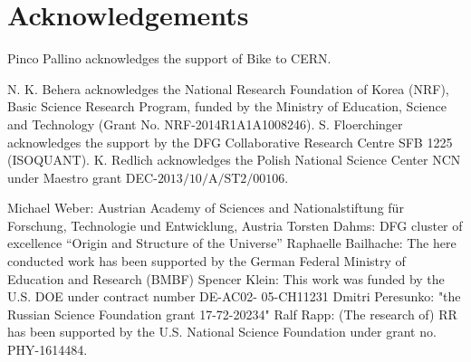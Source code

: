 \section*{Acknowledgements}


Pinco Pallino acknowledges the support of Bike to CERN.

N. K. Behera acknowledges the National Research Foundation of Korea (NRF), Basic Science Research Program, funded by the Ministry of Education, Science and Technology (Grant No. NRF-2014R1A1A1008246).
S. Floerchinger acknowledges the support by the DFG Collaborative Research Centre SFB 1225 (ISOQUANT). 
K. Redlich acknowledges the Polish National Science Center NCN under Maestro grant DEC-$\mathrm{2013/10/A/ST2/00106}$. 

Michael Weber: Austrian Academy of Sciences and Nationalstiftung f\"ur Forschung, Technologie und Entwicklung, Austria
Torsten Dahms: DFG cluster of excellence ``Origin and Structure of the Universe'' 
Raphaelle Bailhache: The here conducted work has been supported by the German Federal Ministry of Education and Research (BMBF)
Spencer Klein: This work was funded by the U.S. DOE under contract number DE-AC02- 05-CH11231
Dmitri Peresunko: "the Russian Science Foundation grant 17-72-20234"
Ralf Rapp: (The research of) RR has been supported by the U.S. National Science Foundation under
grant no. PHY-1614484.
